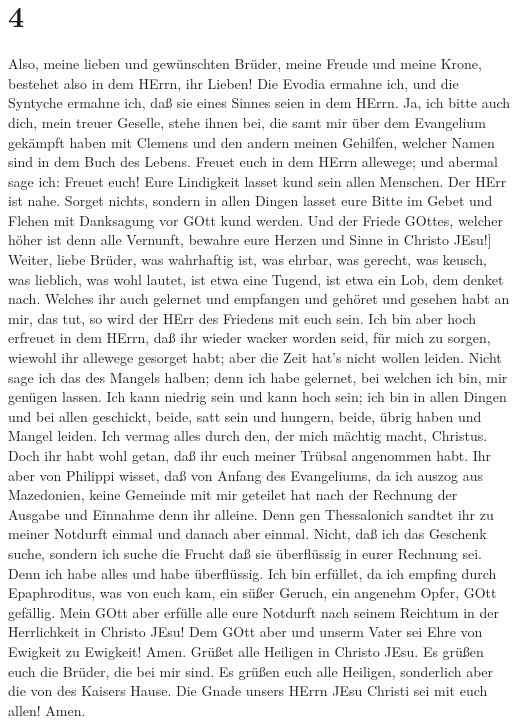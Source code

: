 \hypertarget{section-3}{%
\section{4}\label{section-3}}

 Also, meine lieben und gewünschten Brüder, meine Freude und
meine Krone, bestehet also in dem HErrn, ihr Lieben!  Die
Evodia ermahne ich, und die Syntyche ermahne ich, daß sie eines Sinnes
seien in dem HErrn.  Ja, ich bitte auch dich, mein treuer
Geselle, stehe ihnen bei, die samt mir über dem Evangelium gekämpft
haben mit Clemens und den andern meinen Gehilfen, welcher Namen sind in
dem Buch des Lebens.  Freuet euch in dem HErrn allewege; und
abermal sage ich: Freuet euch!  Eure Lindigkeit lasset kund
sein allen Menschen. Der HErr ist nahe.  Sorget nichts,
sondern in allen Dingen lasset eure Bitte im Gebet und Flehen mit
Danksagung vor GOtt kund werden.  Und der Friede GOttes,
welcher höher ist denn alle Vernunft, bewahre eure Herzen und Sinne in
Christo JEsu!{]}  Weiter, liebe Brüder, was wahrhaftig ist,
was ehrbar, was gerecht, was keusch, was lieblich, was wohl lautet, ist
etwa eine Tugend, ist etwa ein Lob, dem denket nach. 
Welches ihr auch gelernet und empfangen und gehöret und gesehen habt an
mir, das tut, so wird der HErr des Friedens mit euch sein. 
Ich bin aber hoch erfreuet in dem HErrn, daß ihr wieder wacker worden
seid, für mich zu sorgen, wiewohl ihr allewege gesorget habt; aber die
Zeit hat's nicht wollen leiden.  Nicht sage ich das des
Mangels halben; denn ich habe gelernet, bei welchen ich bin, mir genügen
lassen.  Ich kann niedrig sein und kann hoch sein; ich bin
in allen Dingen und bei allen geschickt, beide, satt sein und hungern,
beide, übrig haben und Mangel leiden.  Ich vermag alles
durch den, der mich mächtig macht, Christus.  Doch ihr habt
wohl getan, daß ihr euch meiner Trübsal angenommen habt. 
Ihr aber von Philippi wisset, daß von Anfang des Evangeliums, da ich
auszog aus Mazedonien, keine Gemeinde mit mir geteilet hat nach der
Rechnung der Ausgabe und Einnahme denn ihr alleine.  Denn
gen Thessalonich sandtet ihr zu meiner Notdurft einmal und danach aber
einmal.  Nicht, daß ich das Geschenk suche, sondern ich
suche die Frucht daß sie überflüssig in eurer Rechnung sei.
 Denn ich habe alles und habe überflüssig. Ich bin
erfüllet, da ich empfing durch Epaphroditus, was von euch kam, ein süßer
Geruch, ein angenehm Opfer, GOtt gefällig.  Mein GOtt aber
erfülle alle eure Notdurft nach seinem Reichtum in der Herrlichkeit in
Christo JEsu!  Dem GOtt aber und unserm Vater sei Ehre von
Ewigkeit zu Ewigkeit! Amen.  Grüßet alle Heiligen in
Christo JEsu. Es grüßen euch die Brüder, die bei mir sind. 
Es grüßen euch alle Heiligen, sonderlich aber die von des Kaisers Hause.
 Die Gnade unsers HErrn JEsu Christi sei mit euch allen!
Amen.
